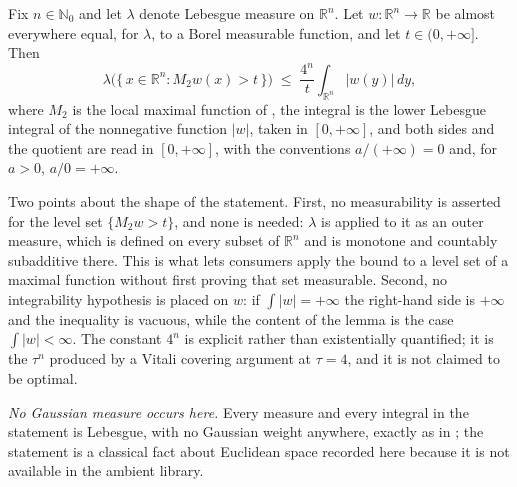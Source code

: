 \begin{lemma}
Fix $n \in \mathbb{N}_0$ and let $\lambda$ denote Lebesgue measure on
$\mathbb{R}^n$.  Let $w : \mathbb{R}^n \to \mathbb{R}$ be almost everywhere
equal, for $\lambda$, to a Borel measurable function, and let
$t \in (0,+\infty]$.  Then
\[
  \lambda\bigl(\{\,x \in \mathbb{R}^n : M_2w(x) > t\,\}\bigr)
    \;\leq\; \frac{4^n}{t}\int_{\mathbb{R}^n}|w(y)|\,dy ,
\]
where $M_2$ is the local maximal function of ,
the integral is the lower Lebesgue integral of the nonnegative function $|w|$,
taken in $[0,+\infty]$, and both sides and the quotient are read in
$[0,+\infty]$, with the conventions $a/(+\infty) = 0$ and, for $a > 0$,
$a/0 = +\infty$.

Two points about the shape of the statement.  First, no measurability is
asserted for the level set $\{M_2w > t\}$, and none is needed: $\lambda$ is
applied to it as an outer measure, which is defined on every subset of
$\mathbb{R}^n$ and is monotone and countably subadditive there.  This is what
lets consumers apply the bound to a level set of a maximal function without
first proving that set measurable.  Second, no integrability hypothesis is
placed on $w$: if $\int|w| = +\infty$ the right-hand side is $+\infty$ and the
inequality is vacuous, while the content of the lemma is the case
$\int|w| < \infty$.  The constant $4^n$ is explicit rather than existentially
quantified; it is the $\tau^n$ produced by a Vitali covering argument at
$\tau = 4$, and it is not claimed to be optimal.

\emph{No Gaussian measure occurs here.}  Every measure and every integral in the
statement is Lebesgue, with no Gaussian weight anywhere, exactly as in
; the statement is a classical fact about
Euclidean space recorded here because it is not available in the ambient
library.
\end{lemma}
